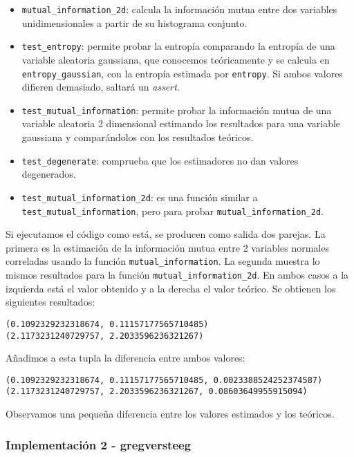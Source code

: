\documentclass[10pt,a4paper]{article} %
\theoremstyle{definition}
\begin{document}
\begin{itemize}
\item \texttt{mutual\_information\_2d}: calcula la información mutua entre dos variables unidimensionales a partir de su histograma conjunto. 

\item \texttt{test\_entropy}: permite probar la entropía comparando la entropía de una variable aleatoria gaussiana, que conocemos teóricamente y se calcula en \texttt{entropy\_gaussian}, con la entropía estimada por \texttt{entropy}. Si ambos valores difieren demasiado, saltará un \textit{assert}.

\item \texttt{test\_mutual\_information}: permite probar la información mutua de una variable aleatoria 2 dimensional estimando los resultados para una variable gaussiana y comparándolos con los resultados teóricos.

\item \texttt{test\_degenerate}: comprueba que los estimadores no dan valores degenerados.

\item \texttt{test\_mutual\_information\_2d}: es una función similar a \texttt{test\_mutual\_information}, pero para probar \texttt{mutual\_information\_2d}.
\end{itemize} 

Si ejecutamos el código como está, se producen como salida dos parejas. La primera es la estimación de la información mutua entre 2 variables normales correladas usando la función \texttt{mutual\_information}. La segunda muestra lo mismos resultados para la función \texttt{mutual\_information\_2d}. En ambos casos a la izquierda está el valor obtenido y a la derecha el valor teórico. Se obtienen los siguientes resultados:
\begin{lstlisting}
(0.1092329232318674, 0.11157177565710485)
(2.1173231240729757, 2.2033596236321267)
\end{lstlisting}

Añadimos a esta tupla la diferencia entre ambos valores:
\begin{lstlisting}
(0.1092329232318674, 0.11157177565710485, 0.0023388524252374587)
(2.1173231240729757, 2.2033596236321267, 0.08603649955915094)
\end{lstlisting}

Observamos una pequeña diferencia entre los valores estimados y los teóricos.

\subsubsection{Implementación 2 -  gregversteeg}
\end{document}
